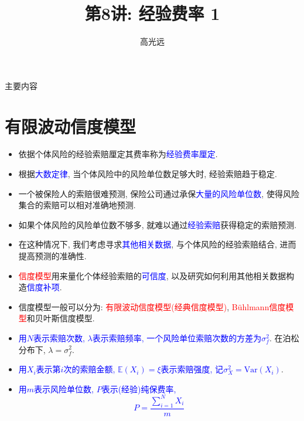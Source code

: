 \documentclass[professionalfont]{beamer}
\title{第8讲: 经验费率 1}
\author{高光远}
\institute{中国人民大学~统计学院}
\date{}
\def\E{{\mathbb E}}  %
\newcommand{\red}[1]{\textcolor{red}{#1}}
\newcommand{\blue}[1]{\textcolor{blue}{#1}}
\begin{document}
\begin{frame}
	\titlepage
\end{frame}

\begin{frame}{主要内容}
	\tableofcontents
\end{frame}




\section{有限波动信度模型}
\begin{frame}
\begin{itemize}
\item 依据个体风险的经验索赔厘定其费率称为\blue{经验费率厘定}.
\item 根据\blue{大数定律}, 当个体风险中的风险单位数足够大时, 经验索赔趋于稳定.
\item 一个被保险人的索赔很难预测, 保险公司通过承保\blue{大量的风险单位数}, 使得风险集合的索赔可以相对准确地预测. 
\item 如果个体风险的风险单位数不够多, 就难以通过\blue{经验索赔}获得稳定的索赔预测.
\item 在这种情况下, 我们考虑寻求\blue{其他相关数据}, 与个体风险的经验索赔结合, 进而提高预测的准确性.
\end{itemize}
\end{frame}

\begin{frame}
\begin{itemize}
\item \red{信度模型}用来量化个体经验索赔的\blue{可信度}, 以及研究如何利用其他相关数据构造\blue{信度补项}.
\item 信度模型一般可以分为: \red{有限波动信度模型(经典信度模型)}, \red{B\"uhlmann信度模型}和贝叶斯信度模型.
\item \blue{用$N$表示索赔次数,  $\lambda$表示索赔频率, 一个风险单位索赔次数的方差为$\sigma^2_f$}. 在泊松分布下, $\lambda=\sigma^2_f$.
\item \blue{用$X_i$表示第$i$次的索赔金额, $\E(X_i)=\xi$表示索赔强度, 记$\sigma^2_X=\text{Var}(X_i)$}.
\item \blue{用$m$表示风险单位数, $P$表示(经验)纯保费率, $$P=\frac{\sum_{i=1}^N X_i}{m}$$}
\end{itemize}
\end{frame}
\end{document}
